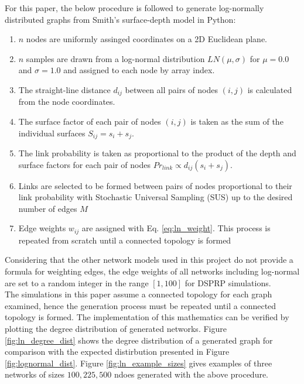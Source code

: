 \documentclass[
	a4paper, %
	10pt, %
	unnumberedsections, %
	twoside, %
]{LTJournalArticle}
\begin{document}
For this paper, the below procedure is followed to generate log-normally distributed graphs from Smith's surface-depth model in Python:
	\begin{enumerate}
  		\item \(n\) nodes are uniformly assinged coordinates on a 2D Euclidean plane. 
  		\item \(n\) samples are drawn from a log-normal distribution \(LN(\mu, \sigma)\) for \(\mu = 0.0\) and \(\sigma = 1.0\) and assigned to each node by array index. 
  		\item The straight-line distance \(d_{ij}\) between all pairs of nodes \((i, j)\) is calculated from the node coordinates.
  		\item The surface factor of each pair of nodes \((i, j)\) is taken as the sum of the individual surfaces \(S_{ij} = s_{i} + s_{j}\).
  		\item The link probability is taken as proportional to the product of the depth and surface factors for each pair of nodes \(Pr_{link} \propto d_{ij}(s_{i} + s_{j})\). 
  		\item Links are selected to be formed between pairs of nodes proportional to their link probability with Stochastic Universal Sampling (SUS) up to the desired number of edges \(M\) 
  		\item Edge weights \(w_{ij}\) are assigned with Eq. \ref{eq:ln_weight}. 
  		\subitem This process is repeated from scratch until a connected topology is formed 
	\end{enumerate}
	
Considering that the other network models used in this project do not provide a formula for weighting edges, the edge weights of all networks including log-normal are set to a random integer in the range \([1, 100]\) for DSPRP simulations. \\

The simulations in this paper assume a connected topology for each graph examined, hence the generation process must be repeated until a connected topology is formed. The implementation of this mathematics can be verified by plotting the degree distribution of generated networks.  Figure \ref{fig:ln_degree_dist} shows the degree distribution of a generated graph for comparison with the expected distirbution presented in Figure \ref{fig:lognormal_dist}. Figure \ref{fig:ln_example_sizes} gives examples of three networks of sizes \(100, 225, 500\) ndoes generated with the above procedure. 
\end{document}
